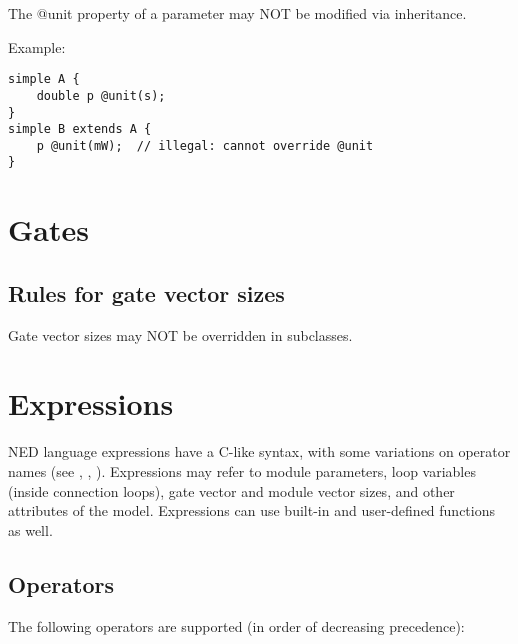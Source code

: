 The @unit property of a parameter may NOT be modified via inheritance.

Example:
\begin{verbatim}
simple A {
    double p @unit(s);
}
simple B extends A {
    p @unit(mW);  // illegal: cannot override @unit
}
\end{verbatim}



\section{Gates}

\subsection{Rules for gate vector sizes}

Gate vector sizes may NOT be overridden in subclasses.



\section{Expressions}
\label{ch-ned-ref:sec:expressions}

NED language expressions have a C-like syntax, with
some variations on operator names (see \ttt{\textasciicircum}, \ttt{\#}, \ttt{\#\#}).
Expressions may refer to module parameters, loop variables (inside connection
 loops), gate vector and module vector sizes, and other attributes
of the model. Expressions can use built-in and user-defined functions as well.

\subsection{Operators}

The following operators are supported (in order of decreasing precedence):

